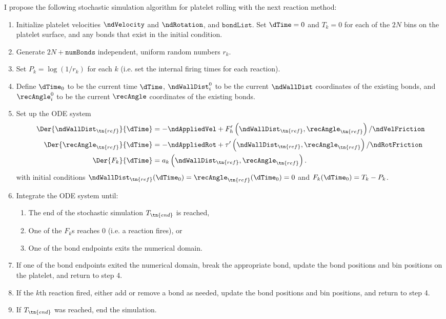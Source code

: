 I propose the following stochastic simulation algorithm for platelet
rolling with the next reaction method:
\begin{enumerate}
\item Initialize platelet velocities $\ndVelocity$ and $\ndRotation$,
  and $\texttt{bondList}$. Set $\dTime = 0$ and $T_k = 0$ for each of the
  $2N$ bins on the platelet surface, and any bonds that exist in the
  initial condition.
\item Generate $2N + \texttt{numBonds}$ independent, uniform random
  numbers $r_k$.
\item Set $P_k = \log(1/r_k)$ for each $k$ (i.e. set the internal
  firing times for each reaction).
\item Define $\dTime_0$ to be the current time $\dTime$,
  $\ndWallDist_i^0$ to be the current $\ndWallDist$ coordinates of the
  existing bonds, and $\recAngle_i^0$ to be the current $\recAngle$
  coordinates of the existing bonds.
\item Set up the ODE system
  \begin{align}
    \Der{\ndWallDist_\tn{ref}}{\dTime}
    &= -\ndAppliedVel + F_h'\left(\ndWallDist_\tn{ref},
      \recAngle_\tn{ref} \right)/\ndVelFriction \\
    \Der{\recAngle_\tn{ref}}{\dTime}
    &= -\ndAppliedRot + \tau'\left(\ndWallDist_\tn{ref},
      \recAngle_\tn{ref} \right)/\ndRotFriction \\
    \Der{F_k}{\dTime} &= a_k\left(\ndWallDist_\tn{ref},
    \recAngle_\tn{ref} \right).
  \end{align}
  with initial conditions $\ndWallDist_\tn{ref}(\dTime_0) =
  \recAngle_\tn{ref}(\dTime_0) = 0$ and $F_k(\dTime_0) = T_k - P_k$. 
\item Integrate the ODE system until:
  \begin{enumerate}
  \item The end of the stochastic simulation $T_\tn{end}$ is reached,
  \item One of the $F_k$s reaches 0 (i.e. a reaction fires), or
  \item One of the bond endpoints exits the numerical domain.
  \end{enumerate}
\item If one of the bond endpoints exited the numerical domain, break
  the appropriate bond, update the bond positions and bin positions on
  the platelet, and return to step 4.
\item If the $k$th reaction fired, either add or remove a bond as
  needed, update the bond positions and bin positions, and return to
  step 4.
\item If $T_\tn{end}$ was reached, end the simulation. 
\end{enumerate}


